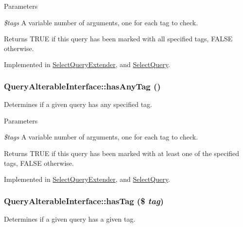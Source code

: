 \begin{DoxyParams}{Parameters}
\item[{\em \$tags}]A variable number of arguments, one for each tag to check.\end{DoxyParams}
\begin{DoxyReturn}{Returns}
TRUE if this query has been marked with all specified tags, FALSE otherwise. 
\end{DoxyReturn}


Implemented in \hyperlink{classSelectQueryExtender_a8dd095d197f27e0670fc2cc423ac99d6}{SelectQueryExtender}, and \hyperlink{classSelectQuery_a4e1f417bc10a31d158260b6534057205}{SelectQuery}.\hypertarget{interfaceQueryAlterableInterface_ae52ceaffc7ad7cf7f2b0542e8d55b3f1}{
\subsubsection[{hasAnyTag}]{\setlength{\rightskip}{0pt plus 5cm}QueryAlterableInterface::hasAnyTag ()}}
\label{interfaceQueryAlterableInterface_ae52ceaffc7ad7cf7f2b0542e8d55b3f1}
Determines if a given query has any specified tag.


\begin{DoxyParams}{Parameters}
\item[{\em \$tags}]A variable number of arguments, one for each tag to check.\end{DoxyParams}
\begin{DoxyReturn}{Returns}
TRUE if this query has been marked with at least one of the specified tags, FALSE otherwise. 
\end{DoxyReturn}


Implemented in \hyperlink{classSelectQueryExtender_a6b6aec8ae5f5c3a98637db9d6e156008}{SelectQueryExtender}, and \hyperlink{classSelectQuery_af5d6a2ad80e61e01d211ed769a60e312}{SelectQuery}.\hypertarget{interfaceQueryAlterableInterface_a1273bb283ebfe44b6c839d97b18056a9}{
\subsubsection[{hasTag}]{\setlength{\rightskip}{0pt plus 5cm}QueryAlterableInterface::hasTag (\$ {\em tag})}}
\label{interfaceQueryAlterableInterface_a1273bb283ebfe44b6c839d97b18056a9}
Determines if a given query has a given tag.


